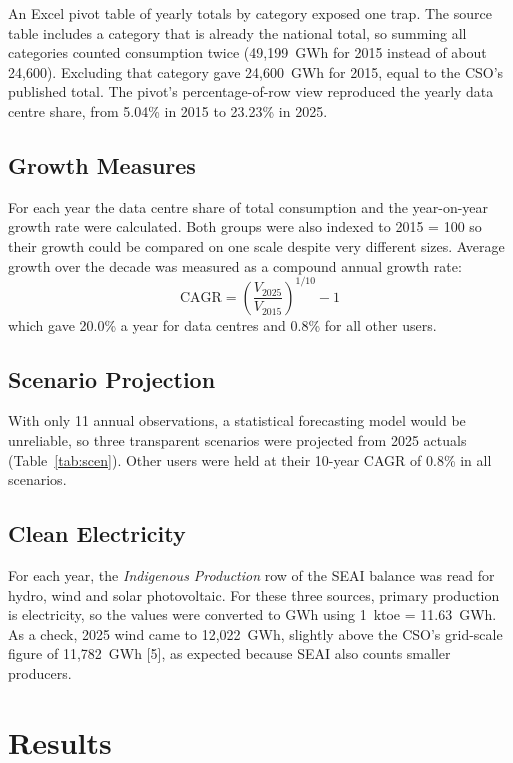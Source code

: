 \documentclass[10pt,twocolumn,a4paper]{article}
\begin{document}
An Excel pivot table of yearly totals by category exposed one trap. The source table includes a category that is already the national total, so summing all categories counted consumption twice (49,199~GWh for 2015 instead of about 24,600). Excluding that category gave 24,600~GWh for 2015, equal to the CSO's published total. The pivot's percentage-of-row view reproduced the yearly data centre share, from 5.04\% in 2015 to 23.23\% in 2025.

\subsection{Growth Measures}

For each year the data centre share of total consumption and the year-on-year growth rate were calculated. Both groups were also indexed to 2015 = 100 so their growth could be compared on one scale despite very different sizes. Average growth over the decade was measured as a compound annual growth rate:
\begin{equation}
\text{CAGR} = \left(\frac{V_{2025}}{V_{2015}}\right)^{1/10} - 1
\end{equation}
which gave 20.0\% a year for data centres and 0.8\% for all other users.

\subsection{Scenario Projection}

With only 11 annual observations, a statistical forecasting model would be unreliable, so three transparent scenarios were projected from 2025 actuals (Table~\ref{tab:scen}). Other users were held at their 10-year CAGR of 0.8\% in all scenarios.

\subsection{Clean Electricity}

For each year, the \textit{Indigenous Production} row of the SEAI balance was read for hydro, wind and solar photovoltaic. For these three sources, primary production is electricity, so the values were converted to GWh using 1~ktoe = 11.63~GWh. As a check, 2025 wind came to 12,022~GWh, slightly above the CSO's grid-scale figure of 11,782~GWh [5], as expected because SEAI also counts smaller producers.

\section{Results}
\end{document}
